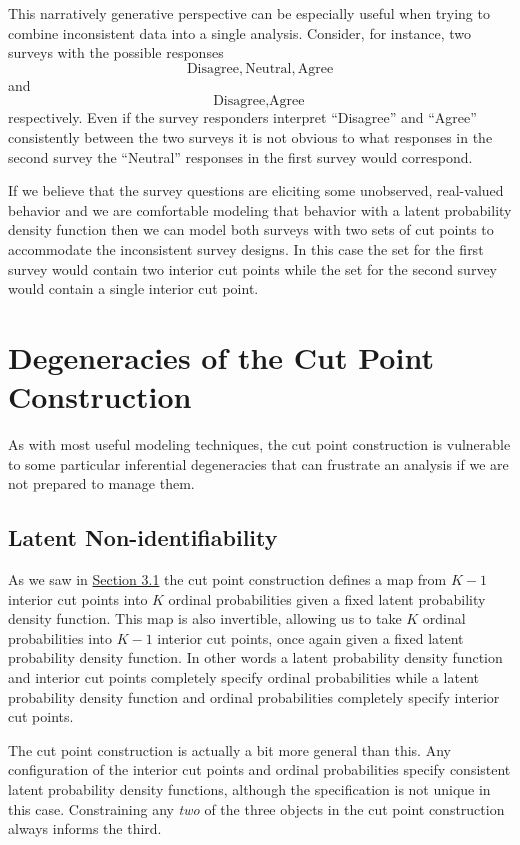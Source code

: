 \documentclass[
  letterpaper,
  DIV=11,
  numbers=noendperiod]{scrartcl}
\begin{document}
This narratively generative perspective can be especially useful when
trying to combine inconsistent data into a single analysis. Consider,
for instance, two surveys with the possible responses \[
\text{Disagree}, \text{Neutral}, \text{Agree}
\] and \[
\text{Disagree}, \text{Agree}
\] respectively. Even if the survey responders interpret ``Disagree''
and ``Agree'' consistently between the two surveys it is not obvious to
what responses in the second survey the ``Neutral'' responses in the
first survey would correspond.

If we believe that the survey questions are eliciting some unobserved,
real-valued behavior and we are comfortable modeling that behavior with
a latent probability density function then we can model both surveys
with two sets of cut points to accommodate the inconsistent survey
designs. In this case the set for the first survey would contain two
interior cut points while the set for the second survey would contain a
single interior cut point.

\section{Degeneracies of the Cut Point
Construction}\label{degeneracies-of-the-cut-point-construction}

As with most useful modeling techniques, the cut point construction is
vulnerable to some particular inferential degeneracies that can
frustrate an analysis if we are not prepared to manage them.

\subsection{Latent Non-identifiability}\label{non-ident}

As we saw in \hyperref[derived-probs]{Section 3.1} the cut point
construction defines a map from \(K - 1\) interior cut points into \(K\)
ordinal probabilities given a fixed latent probability density function.
This map is also invertible, allowing us to take \(K\) ordinal
probabilities into \(K - 1\) interior cut points, once again given a
fixed latent probability density function. In other words a latent
probability density function and interior cut points completely specify
ordinal probabilities while a latent probability density function and
ordinal probabilities completely specify interior cut points.

The cut point construction is actually a bit more general than this. Any
configuration of the interior cut points and ordinal probabilities
specify consistent latent probability density functions, although the
specification is not unique in this case. Constraining any \emph{two} of
the three objects in the cut point construction always informs the
third.
\end{document}
